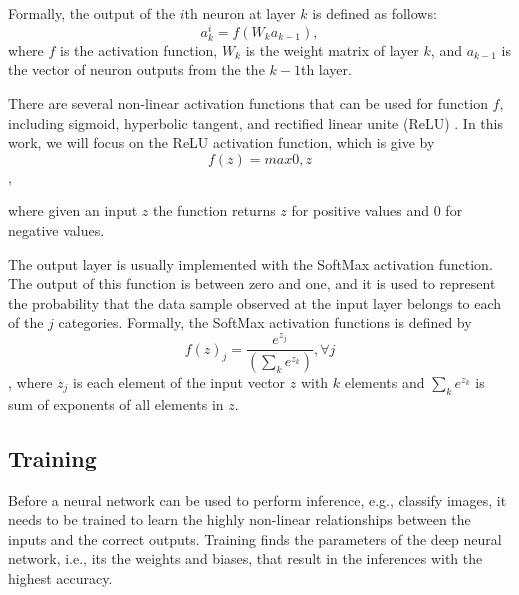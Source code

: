 \documentclass[conference]{IEEEtran}
\begin{document}
Formally, the output of the $i$th neuron at layer $k$ is defined as follows:
$$a^i_k=f(W_k a_{k-1}),$$
where $f$ is the activation function, $W_k$ is the weight matrix of layer $k$,
and $a_{k-1}$ is the vector of neuron outputs from the the $k-1$th layer. 

There are several non-linear activation functions that can be used for function $f$, including sigmoid,
hyperbolic tangent, and rectified linear unite (ReLU) \cite{Goodfellow-et-al-2016}. In this
work, we will focus on the ReLU activation function, which is give by
$$f(z) = max{0, z}$$,

where given an input $z$ the function returns $z$ for positive values and $0$ for negative values.

The output layer is usually implemented with the SoftMax activation function. The output of this function is between zero and
one, and it is used to represent the probability that the data sample observed at the input layer belongs to each of the $j$
categories. Formally, the SoftMax activation functions is defined by
$$f(z)_j = \frac{e^{z_j}} {(\sum_ke^{z_k})}, \forall j$$,
where $z_j$ is each element of the input vector $z$ with $k$ elements and $\sum_ke^{z_k}$ is sum of exponents of all elements in $z$.

\subsection{Training}
Before a neural network can be used to perform inference, e.g., classify images, it needs to be trained to learn the highly non-linear
relationships between the inputs and the correct outputs. Training finds the 
parameters of the deep neural network, i.e., its the weights and biases, that result in the inferences with the highest accuracy.  
\end{document}
